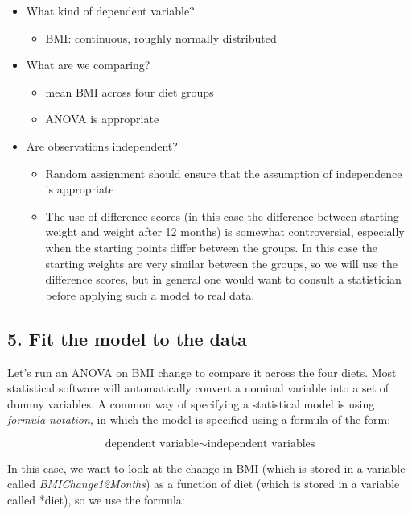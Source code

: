 \documentclass[12pt,]{book}
\providecommand{\tightlist}{%
  \setlength{\itemsep}{0pt}\setlength{\parskip}{0pt}}
\theoremstyle{definition}
\theoremstyle{definition}
\theoremstyle{definition}
\theoremstyle{remark}
\begin{document}
\begin{itemize}
\tightlist
\item
  What kind of dependent variable?

  \begin{itemize}
  \tightlist
  \item
    BMI: continuous, roughly normally distributed
  \end{itemize}
\item
  What are we comparing?

  \begin{itemize}
  \tightlist
  \item
    mean BMI across four diet groups
  \item
    ANOVA is appropriate
  \end{itemize}
\item
  Are observations independent?

  \begin{itemize}
  \tightlist
  \item
    Random assignment should ensure that the assumption of independence is appropriate
  \item
    The use of difference scores (in this case the difference between starting weight and weight after 12 months) is somewhat controversial, especially when the starting points differ between the groups. In this case the starting weights are very similar between the groups, so we will use the difference scores, but in general one would want to consult a statistician before applying such a model to real data.
  \end{itemize}
\end{itemize}

\hypertarget{fit-the-model-to-the-data}{%
\subsection{5. Fit the model to the data}\label{fit-the-model-to-the-data}}

Let's run an ANOVA on BMI change to compare it across the four diets. Most statistical software will automatically convert a nominal variable into a set of dummy variables. A common way of specifying a statistical model is using \emph{formula notation}, in which the model is specified using a formula of the form:

\[ 
\text{dependent variable} \sim \text{independent variables}
\]

In this case, we want to look at the change in BMI (which is stored in a variable called \emph{BMIChange12Months}) as a function of diet (which is stored in a variable called *diet), so we use the formula:
\end{document}
